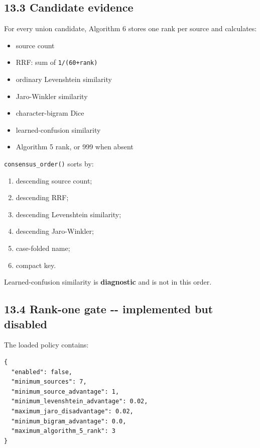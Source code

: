 \subsection{13.3 Candidate evidence}\label{133-candidate-evidence}

For every union candidate, Algorithm 6 stores one rank per source and calculates:

\begin{itemize}
\tightlist
\item
  source count
\item
  RRF: sum of \texttt{1/(60+rank)}
\item
  ordinary Levenshtein similarity
\item
  Jaro-Winkler similarity
\item
  character-bigram Dice
\item
  learned-confusion similarity
\item
  Algorithm 5 rank, or 999 when absent
\end{itemize}

\texttt{consensus\_\allowbreak{}order()} sorts by:

\begin{enumerate}
\def\labelenumi{\arabic{enumi}.}
\tightlist
\item
  descending source count;
\item
  descending RRF;
\item
  descending Levenshtein similarity;
\item
  descending Jaro-Winkler;
\item
  case-folded name;
\item
  compact key.
\end{enumerate}

Learned-confusion similarity is \textbf{diagnostic} and is not in this order.

\subsection{13.4 Rank-one gate -\/- implemented but disabled}\label{134-rank-one-gate----implemented-but-disabled}

The loaded policy contains:

\begin{verbatim}
{
  "enabled": false,
  "minimum_sources": 7,
  "minimum_source_advantage": 1,
  "minimum_levenshtein_advantage": 0.02,
  "maximum_jaro_disadvantage": 0.02,
  "minimum_bigram_advantage": 0.0,
  "maximum_algorithm_5_rank": 3
}
\end{verbatim}

